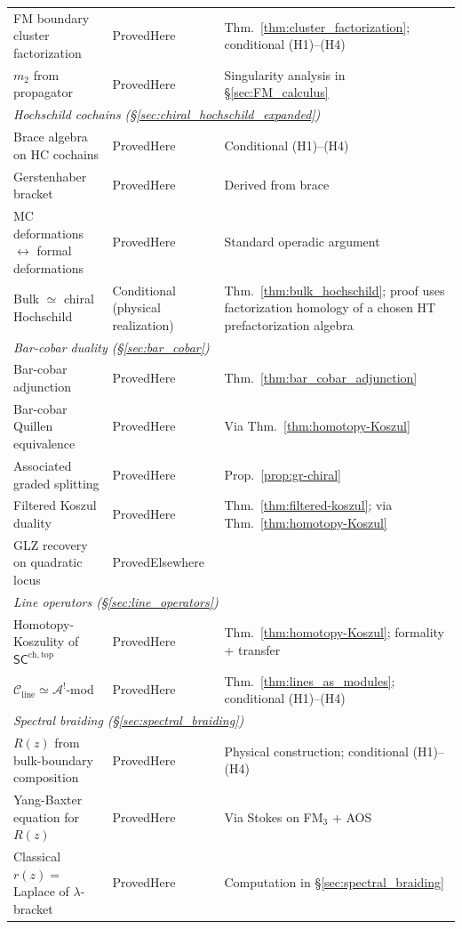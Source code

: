 \begin{center}
\begin{tabular}{p{}p{}p{}}
FM boundary cluster factorization & ProvedHere & Thm.~\ref{thm:cluster_factorization}; conditional (H1)--(H4) \\
$m_2$ from propagator & ProvedHere & Singularity analysis in \S\ref{sec:FM_calculus} \\
\hline
\multicolumn{3}{l}{\emph{Hochschild cochains (\S\ref{sec:chiral_hochschild_expanded})}} \\
Brace algebra on HC cochains & ProvedHere & Conditional (H1)--(H4) \\
Gerstenhaber bracket & ProvedHere & Derived from brace \\
MC deformations $\leftrightarrow$ formal deformations & ProvedHere & Standard operadic argument \\
Bulk $\simeq$ chiral Hochschild & Conditional (physical realization) & Thm.~\ref{thm:bulk_hochschild}; proof uses factorization homology of a chosen HT prefactorization algebra \\
\hline
\multicolumn{3}{l}{\emph{Bar-cobar duality (\S\ref{sec:bar_cobar})}} \\
Bar-cobar adjunction & ProvedHere & Thm.~\ref{thm:bar_cobar_adjunction} \\
Bar-cobar Quillen equivalence & ProvedHere & Via Thm.~\ref{thm:homotopy-Koszul} \\
Associated graded splitting & ProvedHere & Prop.~\ref{prop:gr-chiral} \\
Filtered Koszul duality & ProvedHere & Thm.~\ref{thm:filtered-koszul}; via Thm.~\ref{thm:homotopy-Koszul} \\
GLZ recovery on quadratic locus & ProvedElsewhere & \cite{GLZ22} \\
\hline
\multicolumn{3}{l}{\emph{Line operators (\S\ref{sec:line_operators})}} \\
Homotopy-Koszulity of $\mathsf{SC}^{\mathrm{ch,top}}$ & ProvedHere & Thm.~\ref{thm:homotopy-Koszul}; formality + transfer \\
$\mathcal{C}_{\mathrm{line}} \simeq \mathcal{A}^!$-mod & ProvedHere & Thm.~\ref{thm:lines_as_modules}; conditional (H1)--(H4) \\
\hline
\multicolumn{3}{l}{\emph{Spectral braiding (\S\ref{sec:spectral_braiding})}} \\
$R(z)$ from bulk-boundary composition & ProvedHere & Physical construction; conditional (H1)--(H4) \\
Yang-Baxter equation for $R(z)$ & ProvedHere & Via Stokes on FM$_3$ + AOS \\
Classical $r(z) = $ Laplace of $\lambda$-bracket & ProvedHere & Computation in \S\ref{sec:spectral_braiding} \\

\end{tabular}
\end{center}
